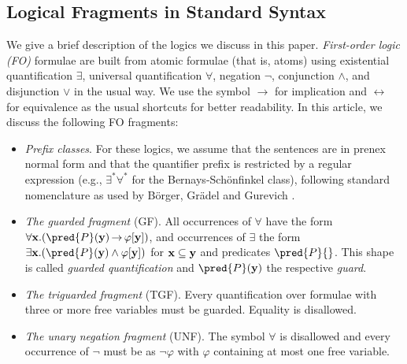 \subsection{Logical Fragments in Standard Syntax}\label{app:standardFO}
\newcommand{\sigP}{\pred{P}}
We give a brief description of the logics we discuss in this paper. 
\emph{First-order logic (FO)} formulae are built from atomic formulae (that is, atoms) using 
existential quantification $\exists$, universal quantification $\forall$, negation $\neg$, conjunction $\wedge$, and disjunction $\vee$ in the usual way.
We use the symbol $\rightarrow$ for implication and $\leftrightarrow$ for equivalence as the usual shortcuts for better readability. 
In this article, we discuss the following FO fragments:
\begin{itemize}
	\item
	\emph{Prefix classes}. 
	For these logics, we assume that the sentences are in prenex normal form and that the quantifier prefix is restricted by a regular expression (e.g., $\exists^*\forall^*$ for the Bernays-Schönfinkel class), following 
	standard nomenclature as used by Börger, Grädel and Gurevich \cite{BorgerGG1997}. 
	\item 
	\emph{The guarded fragment} (GF). %
	All occurrences of $\forall$ have the form 
	$\forall \bold{x}.(\sigP(\bold{y}) {\,\rightarrow\,} \varphi[\bold{y}])$, 
	and occurrences of $\exists$ the form 
	$\exists \bold{x}.(\sigP(\bold{y}) \wedge \varphi[\bold{y}])$
	for $\bold{x} \subseteq \bold{y}$ and predicates $\sigP{}$.
	This shape is called \emph{guarded quantification} and $\sigP(\bold{y})$ the respective \emph{guard}.
	\item
	\emph{The triguarded fragment} (TGF). Every quantification over formulae with three or more free variables must be guarded. Equality is disallowed.
	\item
	\emph{The unary negation fragment} (UNF). The symbol $\forall$ is disallowed 
	and every occurrence of $\neg$ must be as
	$\neg \varphi$ with $\varphi$ containing at most one free variable.

\end{itemize}
